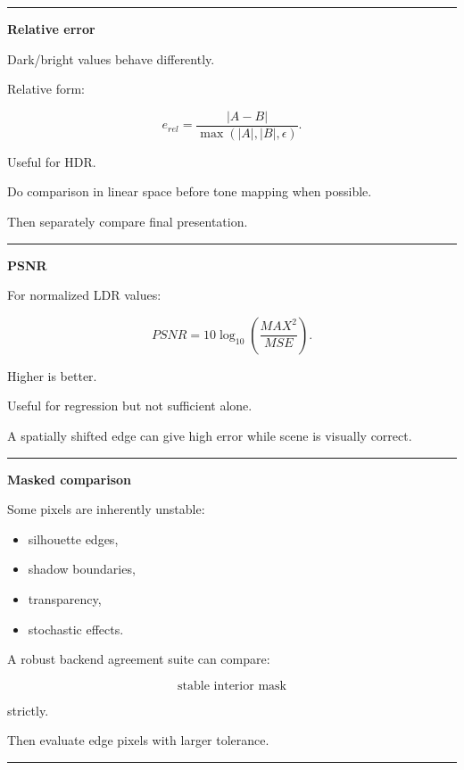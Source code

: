 \begin{center}\rule{0.5\linewidth}{0.5pt}\end{center}

\textbf{Relative error}

Dark/bright values behave differently.

Relative form:

\[
e_{rel}
=
\frac{
|A-B|
}{
\max(|A|,|B|,\epsilon)
}.
\]

Useful for HDR.

Do comparison in linear space before tone mapping when possible.

Then separately compare final presentation.

\begin{center}\rule{0.5\linewidth}{0.5pt}\end{center}

\textbf{PSNR}

For normalized LDR values:

\[
PSNR=
10
\log_{10}
\left(
\frac{MAX^2}{MSE}
\right).
\]

Higher is better.

Useful for regression but not sufficient alone.

A spatially shifted edge can give high error while scene is visually correct.

\begin{center}\rule{0.5\linewidth}{0.5pt}\end{center}

\textbf{Masked comparison}

Some pixels are inherently unstable:

\begin{itemize}
\tightlist
\item
  silhouette edges,
\item
  shadow boundaries,
\item
  transparency,
\item
  stochastic effects.
\end{itemize}

A robust backend agreement suite can compare:

\[
\text{stable interior mask}
\]

strictly.

Then evaluate edge pixels with larger tolerance.

\begin{center}\rule{0.5\linewidth}{0.5pt}\end{center}

